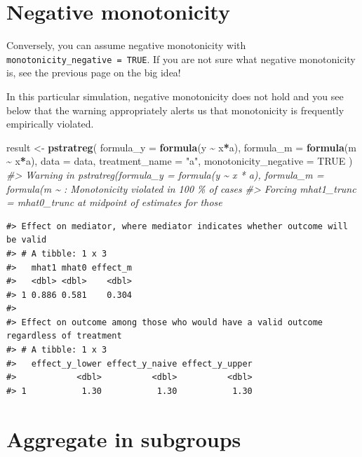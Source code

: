\documentclass[
]{book}
\newenvironment{Shaded}{\begin{snugshade}}{\end{snugshade}}
\newcommand{\AttributeTok}[1]{\textcolor[rgb]{0.13,0.29,0.53}{#1}}
\newcommand{\CommentTok}[1]{\textcolor[rgb]{0.56,0.35,0.01}{\textit{#1}}}
\newcommand{\ConstantTok}[1]{\textcolor[rgb]{0.56,0.35,0.01}{#1}}
\newcommand{\FunctionTok}[1]{\textcolor[rgb]{0.13,0.29,0.53}{\textbf{#1}}}
\newcommand{\NormalTok}[1]{#1}
\newcommand{\OtherTok}[1]{\textcolor[rgb]{0.56,0.35,0.01}{#1}}
\newcommand{\SpecialCharTok}[1]{\textcolor[rgb]{0.81,0.36,0.00}{\textbf{#1}}}
\newcommand{\StringTok}[1]{\textcolor[rgb]{0.31,0.60,0.02}{#1}}
\begin{document}
\hypertarget{negative-monotonicity}{%
\section{Negative monotonicity}\label{negative-monotonicity}}

Conversely, you can assume negative monotonicity with \texttt{monotonicity\_negative\ =\ TRUE}. If you are not sure what negative monotonicity is, see the previous page on the big idea!

In this particular simulation, negative monotonicity does not hold and you see below that the warning appropriately alerts us that monotonicity is frequently empirically violated.

\begin{Shaded}
\begin{Highlighting}[]
\NormalTok{result }\OtherTok{\textless{}{-}} \FunctionTok{pstratreg}\NormalTok{(}
  \AttributeTok{formula\_y =} \FunctionTok{formula}\NormalTok{(y }\SpecialCharTok{\textasciitilde{}}\NormalTok{ x}\SpecialCharTok{*}\NormalTok{a),}
  \AttributeTok{formula\_m =} \FunctionTok{formula}\NormalTok{(m }\SpecialCharTok{\textasciitilde{}}\NormalTok{ x}\SpecialCharTok{*}\NormalTok{a),}
  \AttributeTok{data =}\NormalTok{ data,}
  \AttributeTok{treatment\_name =} \StringTok{"a"}\NormalTok{,}
  \AttributeTok{monotonicity\_negative =} \ConstantTok{TRUE}
\NormalTok{)}
\CommentTok{\#\textgreater{} Warning in pstratreg(formula\_y = formula(y \textasciitilde{} x * a), formula\_m = formula(m \textasciitilde{} : Monotonicity violated in 100 \% of cases}
\CommentTok{\#\textgreater{} Forcing mhat1\_trunc = mhat0\_trunc at midpoint of estimates for those}
\end{Highlighting}
\end{Shaded}

\begin{verbatim}
#> Effect on mediator, where mediator indicates whether outcome will be valid
#> # A tibble: 1 x 3
#>   mhat1 mhat0 effect_m
#>   <dbl> <dbl>    <dbl>
#> 1 0.886 0.581    0.304
#> 
#> Effect on outcome among those who would have a valid outcome regardless of treatment
#> # A tibble: 1 x 3
#>   effect_y_lower effect_y_naive effect_y_upper
#>            <dbl>          <dbl>          <dbl>
#> 1           1.30           1.30           1.30
\end{verbatim}

\hypertarget{aggregate-in-subgroups}{%
\section{Aggregate in subgroups}\label{aggregate-in-subgroups}}
\end{document}
